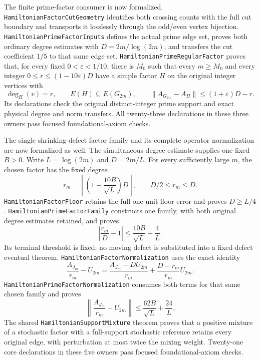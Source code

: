 The finite prime-factor consumer is now formalized.
\texttt{HamiltonianFactorCutGeometry} identifies both crossing
counts with the full cut boundary and transports it losslessly
through the odd/even vertex bijection.
\texttt{HamiltonianPrimeFactorInputs} defines the actual prime
edge set, proves both ordinary degree estimates with
\(D=2m/\log(2m)\), and transfers the cut coefficient \(1/5\)
to that same edge set.
\texttt{HamiltonianPrimeRegularFactor} proves that, for every
fixed \(0<\varepsilon<1/10\), there is \(M_0\) such that
every \(m\geq M_0\) and every integer
\(0\leq r\leq(1-10\varepsilon)D\) have a simple factor \(H\)
on the original integer vertices with
\[
 \deg_H(v)=r,\qquad E(H)\subseteq E(G_{2m}),\qquad
 \|A_{G_{2m}}-A_H\|\leq(1+\varepsilon)D-r.
\]
Its declarations check the original distinct-integer prime
support and exact physical degree and norm transfers.
All twenty-three declarations in these three owners pass
focused foundational-axiom checks.

The single shrinking-defect factor family and its complete
operator normalization are now formalized as well.
The simultaneous degree estimate supplies one fixed \(B>0\).
Write \(L=\log(2m)\) and \(D=2m/L\). For every sufficiently
large \(m\), the chosen factor has the fixed degree
\[
 r_m=\left\lfloor
       \left(1-\frac{10B}{\sqrt L}\right)D
     \right\rfloor,\qquad D/2\leq r_m\leq D.
\]
\texttt{HamiltonianFactorFloor} retains the full one-unit
floor error and proves \(D\geq L/4\).
\texttt{HamiltonianPrimeFactorFamily} constructs one family,
with both original degree estimates retained, and proves
\[
 \left|\frac{r_m}{D}-1\right|
       \leq\frac{10B}{\sqrt L}+\frac4L.
\]
Its terminal threshold is fixed; no moving defect is
substituted into a fixed-defect eventual theorem.
\texttt{HamiltonianFactorNormalization} uses the exact identity
\[
 \frac{A_{J_m}}{r_m}-U_{2m}
 =\frac{A_{J_m}-D U_{2m}}{r_m}
       +\frac{D-r_m}{r_m}U_{2m}.
\]
\texttt{HamiltonianPrimeFactorNormalization} consumes both
terms for that same chosen family and proves
\[
 \left\|\frac{A_{J_m}}{r_m}-U_{2m}\right\|
                 \leq\frac{62B}{\sqrt L}+\frac{24}L.
\]
The shared \texttt{HamiltonianSupportMixture} theorem proves
that a positive mixture of a stochastic factor with a
full-support stochastic reference retains every original
edge, with perturbation at most twice the mixing weight.
Twenty-one core declarations in these five owners pass
focused foundational-axiom checks.

